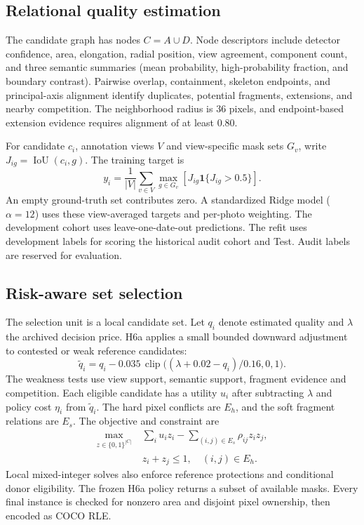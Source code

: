 \documentclass[sigconf]{acmart}
\begin{document}
\subsection{Relational quality estimation}
The candidate graph has nodes $C=A\cup D$. Node descriptors include detector confidence, area, elongation, radial position, view agreement, component count, and three semantic summaries (mean probability, high-probability fraction, and boundary contrast). Pairwise overlap, containment, skeleton endpoints, and principal-axis alignment identify duplicates, potential fragments, extensions, and nearby competition. The neighborhood radius is 36 pixels, and endpoint-based extension evidence requires alignment of at least 0.80.

For candidate $c_i$, annotation views $V$ and view-specific mask sets $G_v$, write $J_{ig}=\operatorname{IoU}(c_i,g)$. The training target is
\begin{equation}
y_i=\frac{1}{|V|}\sum_{v\in V}\max_{g\in G_v}
\left[J_{ig}\mathbf{1}\{J_{ig}>0.5\}\right].
\end{equation}
An empty ground-truth set contributes zero. A standardized Ridge model ($\alpha=12$) uses these view-averaged targets and per-photo weighting. The development cohort uses leave-one-date-out predictions. The refit uses development labels for scoring the historical audit cohort and Test. Audit labels are reserved for evaluation.

\subsection{Risk-aware set selection}
The selection unit is a local candidate set. Let $q_i$ denote estimated quality and $\lambda$ the archived decision price. H6a applies a small bounded downward adjustment to contested or weak reference candidates:
\begin{equation}
\widetilde q_i=q_i-0.035\,\operatorname{clip}\bigl((\lambda+0.02-q_i)/0.16,0,1\bigr).
\end{equation}
The weakness tests use view support, semantic support, fragment evidence and competition. Each eligible candidate has a utility $u_i$ after subtracting $\lambda$ and policy cost $\eta_i$ from $\widetilde q_i$. The hard pixel conflicts are $E_h$, and the soft fragment relations are $E_s$. The objective and constraint are
\begin{align}
\max_{z\in\{0,1\}^{|C|}}\;&\sum_i u_i z_i-\sum_{(i,j)\in E_s}\rho_{ij}z_i z_j,\\
&z_i+z_j\leq1,\quad (i,j)\in E_h.
\end{align}
Local mixed-integer solves also enforce reference protections and conditional donor eligibility. The frozen H6a policy returns a subset of available masks. Every final instance is checked for nonzero area and disjoint pixel ownership, then encoded as COCO RLE.
\end{document}
